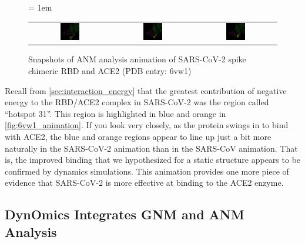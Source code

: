 \begin{figure}[h]
	\centering
	\tabcolsep = 1em
	\mySfFamily
	\begin{tabular}{c c c}
		\includegraphics[width = 0.25\textwidth]{../images/6vw1_animation1.png} & \includegraphics[width = 0.25\textwidth]{../images/6vw1_animation2.png} & \includegraphics[width = 0.25\textwidth]{../images/6vw1_animation3.png}
	\end{tabular}
	\caption{Snapshots of ANM analysis animation of SARS-CoV-2 spike chimeric RBD and ACE2 (PDB entry: 6vw1)}
	\label{fig:6vw1_animation}
\end{figure}

Recall from \autoref{sec:interaction_energy} that the greatest contribution of negative energy to the RBD/ACE2 complex in SARS-CoV-2 was the region called ``hotspot 31''. This region is highlighted in blue and orange in \autoref{fig:6vw1_animation}. If you look very closely, as the protein swings in to bind with ACE2, the blue and orange regions appear to line up just a bit more naturally in the SARS-CoV-2 animation than in the SARS-CoV animation. That is, the improved binding that we hypothesized for a static structure appears to be confirmed by dynamics simulations. This animation provides one more piece of evidence that SARS-CoV-2 is more effective at binding to the ACE2 enzyme.

\FloatBarrier
{}
\subsection{DynOmics Integrates GNM and ANM Analysis}

